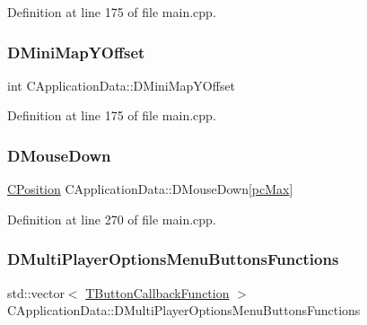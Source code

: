 Definition at line 175 of file main.\+cpp.

\hypertarget{classCApplicationData_ad33fc850bd8262a4bdf1f23e9477d5ad}{}\label{classCApplicationData_ad33fc850bd8262a4bdf1f23e9477d5ad} 
\subsubsection{\texorpdfstring{D\+Mini\+Map\+Y\+Offset}{DMiniMapYOffset}}
{\footnotesize\ttfamily int C\+Application\+Data\+::\+D\+Mini\+Map\+Y\+Offset\hspace{0.3cm}{\ttfamily [protected]}}



Definition at line 175 of file main.\+cpp.

\hypertarget{classCApplicationData_ad7a43a29e7906e44f09347850796a915}{}\label{classCApplicationData_ad7a43a29e7906e44f09347850796a915} 
\subsubsection{\texorpdfstring{D\+Mouse\+Down}{DMouseDown}}
{\footnotesize\ttfamily \hyperlink{classCPosition}{C\+Position} C\+Application\+Data\+::\+D\+Mouse\+Down\mbox{[}\hyperlink{GameDataTypes_8h_aafb0ca75933357ff28a6d7efbdd7602fa594a5c8dd3987f24e8a0f23f1a72cd34}{pc\+Max}\mbox{]}\hspace{0.3cm}{\ttfamily [protected]}}



Definition at line 270 of file main.\+cpp.

\hypertarget{classCApplicationData_ad32d3cc90fd1ead1574cb6c336257e1c}{}\label{classCApplicationData_ad32d3cc90fd1ead1574cb6c336257e1c} 
\subsubsection{\texorpdfstring{D\+Multi\+Player\+Options\+Menu\+Buttons\+Functions}{DMultiPlayerOptionsMenuButtonsFunctions}}
{\footnotesize\ttfamily std\+::vector$<$ \hyperlink{main_8cpp_af91bc223ea3fea871af009bfef33c595}{T\+Button\+Callback\+Function} $>$ C\+Application\+Data\+::\+D\+Multi\+Player\+Options\+Menu\+Buttons\+Functions\hspace{0.3cm}{\ttfamily [protected]}}



